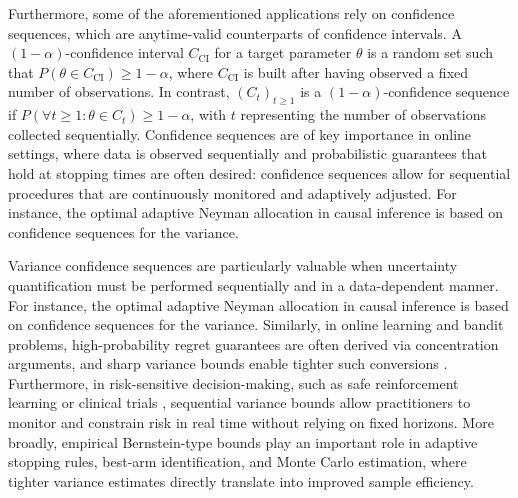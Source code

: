 Furthermore, some of the aforementioned applications rely on confidence sequences, which are anytime-valid counterparts of confidence intervals. A $(1-\alpha)$-confidence interval $C_{\text{CI}}$ for a target parameter $\theta$ is a random set  such that $P (\theta \in C_{\text{CI}}) \geq 1-\alpha$, where $C_{\text{CI}}$ is built after having observed a fixed number of observations. In contrast, $(C_{t})_{t\geq1}$ is a $(1-\alpha)$-confidence sequence if  $P (\forall t\geq 1: \theta \in C_{t}) \geq 1-\alpha$, with $t$ representing the number of observations collected sequentially. Confidence sequences are of key importance in online settings, where data is observed sequentially and probabilistic guarantees that hold at stopping times are often desired: confidence sequences allow for sequential procedures that are continuously monitored and adaptively adjusted. For instance, the optimal adaptive Neyman allocation in causal inference  \citep{neopane2025optimistic} is based on confidence sequences for the variance. %

Variance confidence sequences are particularly valuable when uncertainty quantification must be performed sequentially and in a data-dependent manner. For instance, the optimal adaptive Neyman allocation in causal inference \citep{neopane2025optimistic} is based on confidence sequences for the variance. Similarly, in online learning and bandit problems, high-probability regret guarantees are often derived via concentration arguments, and sharp variance bounds enable tighter such conversions \citep{mnih2008empirical, audibert2009exploration}. Furthermore, in risk-sensitive decision-making, such as safe reinforcement learning or clinical trials \citep{kazerouni2017conservative, howard2021time}, sequential variance bounds allow practitioners to monitor and constrain risk in real time without relying on fixed horizons. More broadly, empirical Bernstein-type bounds play an important role in adaptive stopping rules, best-arm identification, and Monte Carlo estimation, where tighter variance estimates directly translate into improved sample efficiency. 





